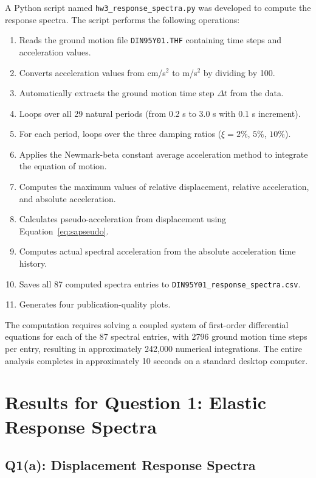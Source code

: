 ﻿\documentclass[12pt]{article}
\begin{document}
A Python script named \texttt{hw3\_response\_spectra.py} was developed to compute the response spectra. The script performs the following operations:

\begin{enumerate}
    \item Reads the ground motion file \texttt{DIN95Y01.THF} containing time steps and acceleration values.
    \item Converts acceleration values from cm/s\(^2\) to m/s\(^2\) by dividing by 100.
    \item Automatically extracts the ground motion time step \(\Delta t\) from the data.
    \item Loops over all 29 natural periods (from 0.2 s to 3.0 s with 0.1 s increment).
    \item For each period, loops over the three damping ratios (\(\xi = 2\%\), \(5\%\), \(10\%\)).
    \item Applies the Newmark-beta constant average acceleration method to integrate the equation of motion.
    \item Computes the maximum values of relative displacement, relative acceleration, and absolute acceleration.
    \item Calculates pseudo-acceleration from displacement using Equation~\ref{eq:sapseudo}.
    \item Computes actual spectral acceleration from the absolute acceleration time history.
    \item Saves all 87 computed spectra entries to \texttt{DIN95Y01\_response\_spectra.csv}.
    \item Generates four publication-quality plots.
\end{enumerate}

The computation requires solving a coupled system of first-order differential equations for each of the 87 spectral entries, with 2796 ground motion time steps per entry, resulting in approximately 242,000 numerical integrations. The entire analysis completes in approximately 10 seconds on a standard desktop computer.

\section{Results for Question 1: Elastic Response Spectra}

\subsection{Q1(a): Displacement Response Spectra}
\end{document}
